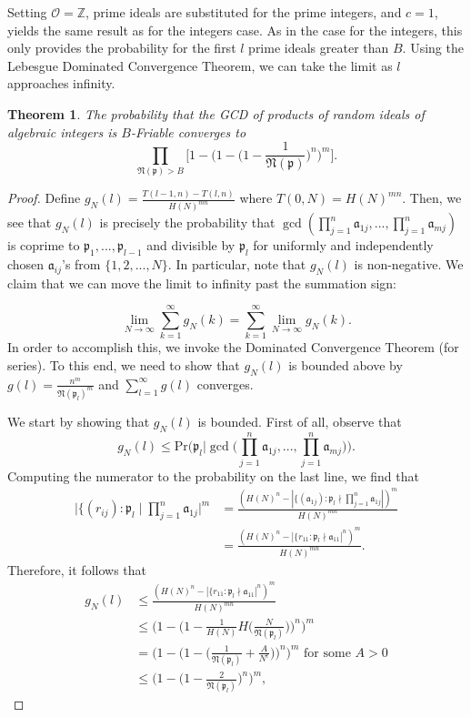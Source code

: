 \documentclass[10pt,a4paper]{article}
\newtheorem{theorem}{Theorem}[section]
\theoremstyle{definition}
\theoremstyle{remark}
\newcommand{\f}[1]{\mathfrak{#1}}
\begin{document}
Setting \(\mathcal{O}=\mathbb{Z}\), prime ideals are substituted for the prime integers, and \(c=1\), yields the same result as for the integers case. As in the case for the integers, this only provides the probability for the first \(l\) prime ideals greater than \(B\). Using the Lebesgue Dominated Convergence Theorem, we can take the limit as \(l\) approaches infinity.

\begin{theorem}
The probability that the GCD of products of random ideals of algebraic integers is $B$-Friable converges to
$$\prod_{\f{N}(\f{p})>B}\Big[1 - \Big(1 - \Big(1 - \frac{1}{\f{N}(\f{p})}\Big)^n \Big)^m \Big].$$
\end{theorem}

\begin{proof}
Define $g_N(l) = \frac{T(l-1, n) - T(l, n)}{H(N)^{mn}}$ where $T(0, N) = H(N)^{mn}$. Then, we see that $g_N(l)$ is precisely the probability that $\gcd(\prod_{j=1}^n \mathfrak{a}_{1j}, ... , \prod_{j=1}^n \mathfrak{a}_{mj})$ is coprime to $\mathfrak{p}_1, ..., \mathfrak{p}_{l-1}$ and divisible by $\mathfrak{p}_l$ for uniformly and independently chosen $\mathfrak{a}_{ij}$'s from $\{1, 2, ..., N\}$. In particular, note that $g_N(l)$ is non-negative. We claim that we can move the limit to infinity past the summation sign:

$$\lim_{N \to \infty} \sum_{k=1}^{\infty} g_N(k) = \sum_{k=1}^{\infty} \lim_{N \to \infty} g_N(k).$$
In order to accomplish this, we invoke the Dominated Convergence Theorem (for series). To this end, we need to show that $g_N(l)$ is bounded above by $g(l) = \frac{n^m}{\mathfrak{N}(\mathfrak{p}_l)^m}$ and $\sum_{l=1}^{\infty} g(l)$ converges.

We start by showing that $g_N(l)$ is bounded. First of all, observe that
$$g_N(l) \leq \text{Pr}\Big(\mathfrak{p}_l \Big| \gcd\Big(\prod_{j=1}^n \mathfrak{a}_{1j}, ... , \prod_{j=1}^n \mathfrak{a}_{mj}\Big)\Big).$$
Computing the numerator to the probability on the last line, we find that
\begin{align*} 
\Big|\{(r_{ij}) : \mathfrak{p}_l \mid \prod_{j=1}^n \mathfrak{a}_{1j}\Big|^m &= \frac{(H(N)^n - |\{(\mathfrak{a}_{1j}) : \mathfrak{p}_l \nmid \prod_{j=1}^n \mathfrak{a}_{1j}|)^m}{H(N)^{mn}}\\ &= \frac{(H(N)^n - |\{r_{11} : \mathfrak{p}_l \nmid \mathfrak{a}_{11}|^n)^m}{H(N)^{mn}}. \end{align*}
Therefore, it follows that
\begin{align*} 
g_N(l) &\leq \frac{(H(N)^n - |\{r_{11} : \mathfrak{p}_l \nmid \mathfrak{a}_{11}|^n)^m}{H(N)^{mn}}\\ &\leq \Big(1 - \Big(1 - \frac{1}{H(N)} H\Big(\frac{N}{\f{N}(\f{p}_l)}\Big)\Big)^n\Big)^m\\
&= \Big(1- \Big(1 - \Big(\frac{1}{\mathfrak{N}(\mathfrak{p}_l)} + \frac{A}{N^{\epsilon}}\Big)\Big)^n \Big)^m \text{ for some } A > 0\\ &\leq \Big(1- \Big(1 - \frac{2}{\mathfrak{N}(\mathfrak{p}_l)}\Big)^n \Big)^m, \end{align*}


\end{proof}
\end{document}
